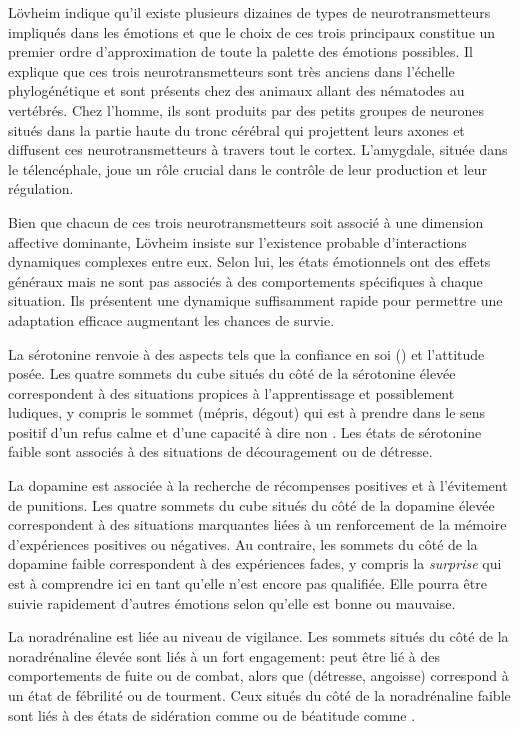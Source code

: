 Lövheim indique qu'il existe plusieurs dizaines de types de neurotransmetteurs impliqués dans les émotions et que le choix de ces trois principaux constitue un premier ordre d'approximation de toute la palette des émotions possibles.  
Il explique que ces trois neurotransmetteurs sont très anciens dans l'échelle phylogénétique et sont présents chez des animaux allant des nématodes au vertébrés. 
Chez l'homme, ils sont produits par des petits groupes de neurones situés dans la partie haute du tronc cérébral qui projettent leurs axones et diffusent ces neurotransmetteurs à travers tout le cortex. 
L'amygdale, située dans le télencéphale, joue un rôle crucial dans le contrôle de leur production et leur régulation.

Bien que chacun de ces trois neurotransmetteurs soit associé à une dimension affective dominante, Lövheim insiste sur l’existence probable d’interactions dynamiques complexes entre eux.
Selon lui, les états émotionnels ont des effets généraux mais ne sont pas associés à des comportements spécifiques à chaque situation.
Ils présentent une dynamique suffisamment rapide pour permettre une adaptation efficace augmentant les chances de survie. 

La sérotonine renvoie à des aspects tels que la confiance en soi () et l'attitude posée.
Les quatre sommets du cube situés du côté de la sérotonine élevée correspondent à des situations propices à l'apprentissage et possiblement ludiques, y compris le sommet  (mépris, dégout) qui est à prendre dans le sens positif d'un refus calme et d'une capacité à dire \og non \fg. 
Les états de sérotonine faible sont associés à des situations de découragement ou de détresse. 

La dopamine est associée à la recherche de récompenses positives et à l'évitement de punitions.
Les quatre sommets du cube situés du côté de la dopamine élevée correspondent à des situations marquantes liées à un renforcement de la mémoire d'expériences positives ou négatives.
Au contraire, les sommets du côté de la dopamine faible correspondent à des expériences fades, y compris la \emph{surprise} qui est à comprendre ici en tant qu'elle n'est encore pas qualifiée. 
Elle pourra être suivie rapidement d'autres émotions selon qu'elle est bonne ou mauvaise.

La noradrénaline est liée au niveau de vigilance. 
Les sommets situés du côté de la noradrénaline élevée sont liés à un fort engagement:  peut être lié à des comportements de fuite ou de combat, alors que  (détresse, angoisse) correspond à un état de fébrilité ou de tourment.
Ceux situés du côté de la noradrénaline faible sont liés à des états de sidération comme  ou de béatitude comme . 

